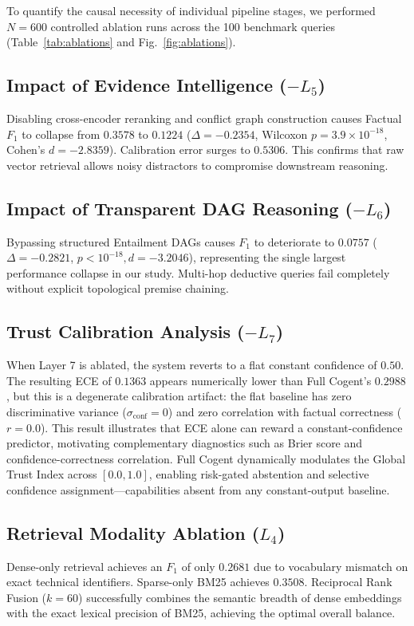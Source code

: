 \documentclass[journal,compsoc]{IEEEtran}
\begin{document}
To quantify the causal necessity of individual pipeline stages, we performed $N=600$ controlled ablation runs across the 100 benchmark queries (Table~\ref{tab:ablations} and Fig.~\ref{fig:ablations}).

\subsection{Impact of Evidence Intelligence ($-L_5$)}
Disabling cross-encoder reranking and conflict graph construction causes Factual $F_1$ to collapse from $0.3578$ to \textbf{$0.1224$} ($\Delta = -0.2354$, Wilcoxon $p = 3.9 \times 10^{-18}$, Cohen's $d = -2.8359$). Calibration error surges to $0.5306$. This confirms that raw vector retrieval allows noisy distractors to compromise downstream reasoning.

\subsection{Impact of Transparent DAG Reasoning ($-L_6$)}
Bypassing structured Entailment DAGs causes $F_1$ to deteriorate to \textbf{$0.0757$} ($\Delta = -0.2821$, $p < 10^{-18}, d = -3.2046$), representing the single largest performance collapse in our study. Multi-hop deductive queries fail completely without explicit topological premise chaining.

\subsection{Trust Calibration Analysis ($-L_7$)}
When Layer 7 is ablated, the system reverts to a flat constant confidence of $0.50$. The resulting ECE of $0.1363$ appears numerically lower than Full Cogent's $0.2988$, but this is a degenerate calibration artifact: the flat baseline has zero discriminative variance ($\sigma_{\text{conf}} = 0$) and zero correlation with factual correctness ($r = 0.0$). This result illustrates that ECE alone can reward a constant-confidence predictor, motivating complementary diagnostics such as Brier score and confidence-correctness correlation. Full Cogent dynamically modulates the Global Trust Index across $[0.0, 1.0]$, enabling risk-gated abstention and selective confidence assignment---capabilities absent from any constant-output baseline.

\subsection{Retrieval Modality Ablation ($L_4$)}
Dense-only retrieval achieves an $F_1$ of only $0.2681$ due to vocabulary mismatch on exact technical identifiers. Sparse-only BM25 achieves $0.3508$. Reciprocal Rank Fusion ($k=60$) successfully combines the semantic breadth of dense embeddings with the exact lexical precision of BM25, achieving the optimal overall balance.
\end{document}
